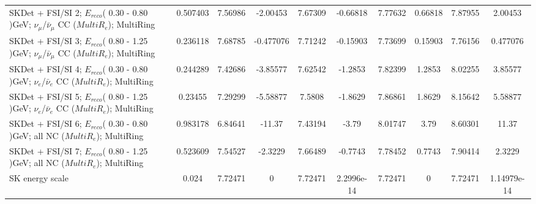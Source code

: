 \begin{tabular}{| l | S | S  S | S  S | S  S | S  S | }
SKDet + FSI/SI  2; $E_{reco}$( 0.30 - 0.80 )GeV; $\nu_{\mu}$/$\bar{\nu}_{\mu}$ CC ($MultiR_{e}$); MultiRing &        0.507403 &         7.56986 &        -2.00453 &         7.67309 &        -0.66818 &         7.77632 &         0.66818 &         7.87955 &         2.00453 \\ 
SKDet + FSI/SI  3; $E_{reco}$( 0.80 - 1.25 )GeV; $\nu_{\mu}$/$\bar{\nu}_{\mu}$ CC ($MultiR_{e}$); MultiRing &        0.236118 &         7.68785 &       -0.477076 &         7.71242 &        -0.15903 &         7.73699 &         0.15903 &         7.76156 &        0.477076 \\ 
SKDet + FSI/SI  4; $E_{reco}$( 0.30 - 0.80 )GeV; $\nu_{e}$/$\bar{\nu}_{e}$ CC ($MultiR_{e}$); MultiRing &        0.244289 &         7.42686 &        -3.85577 &         7.62542 &         -1.2853 &         7.82399 &          1.2853 &         8.02255 &         3.85577 \\ 
SKDet + FSI/SI  5; $E_{reco}$( 0.80 - 1.25 )GeV; $\nu_{e}$/$\bar{\nu}_{e}$ CC ($MultiR_{e}$); MultiRing &         0.23455 &         7.29299 &        -5.58877 &          7.5808 &         -1.8629 &         7.86861 &          1.8629 &         8.15642 &         5.58877 \\ 
SKDet + FSI/SI  6; $E_{reco}$( 0.30 - 0.80 )GeV; all NC ($MultiR_{e}$); MultiRing &        0.983178 &         6.84641 &          -11.37 &         7.43194 &           -3.79 &         8.01747 &            3.79 &         8.60301 &           11.37 \\ 
SKDet + FSI/SI  7; $E_{reco}$( 0.80 - 1.25 )GeV; all NC ($MultiR_{e}$); MultiRing &        0.523609 &         7.54527 &         -2.3229 &         7.66489 &         -0.7743 &         7.78452 &          0.7743 &         7.90414 &          2.3229 \\ 
                                                                 SK energy scale &           0.024 &         7.72471 &               0 &         7.72471 &      2.2996e-14 &         7.72471 &               0 &         7.72471 &     1.14979e-14 \\ 
\bottomrule
\end{tabular}
